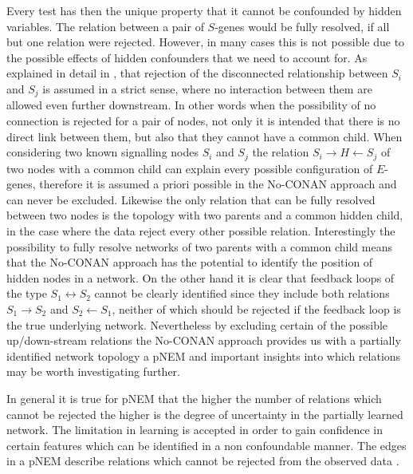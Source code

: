 Every test has then the unique property that it cannot be confounded by hidden variables. The relation between a pair of $S$-genes would be fully resolved, if all but one relation were rejected. However, in many cases this is not possible due to the possible effects of hidden confounders that we need to account for. As explained in detail in \cite{art:SadehMS2013}, that rejection of the disconnected relationship between $S_i$ and $S_j$ is assumed in a strict sense, where no interaction between them are allowed even further downstream. In other words when the possibility of no connection is rejected for a pair of nodes, not only it is intended that there is no direct link between them, but also that they cannot have a common child. When considering two known signalling nodes $S_i$ and $S_j$ the relation $S_i \rightarrow H \leftarrow S_j$ of two nodes with a common child can explain every possible configuration of $E$-genes, therefore it is assumed a priori possible in the No-CONAN approach and can never be excluded. Likewise the only relation that can be fully resolved between two nodes is the topology with two parents and a common hidden child, in the case where the data reject every other possible relation. Interestingly the possibility to fully resolve networks of two parents with a common child means that the No-CONAN approach has the potential to identify the position of hidden nodes in a network. On the other hand it is clear that feedback loops of the type $S_1 \leftrightarrow S_2$ cannot be clearly identified since they include both relations $S_1 \rightarrow S_2$ and  $S_2 \leftarrow S_1$, neither of which should be rejected if the feedback loop is the true underlying network. Nevertheless by excluding certain of the possible up/down-stream relations the No-CONAN approach provides us with a partially identified network topology a pNEM and important insights into which relations may be worth investigating further.

In general it is true for pNEM that the higher the number of relations which cannot be rejected the higher is the degree of uncertainty in the partially learned network. The limitation in learning is accepted in order to gain confidence in certain features which can be identified in a non confoundable manner. The edges in a pNEM describe relations which cannot be rejected from the observed data \cite{art:SadehMS2013}.

